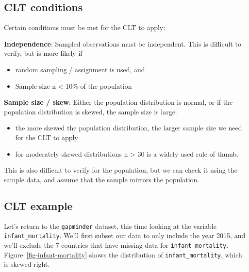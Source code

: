 \documentclass[
  letterpaper,
  DIV=11,
  numbers=noendperiod]{scrreprt}
\providecommand{\tightlist}{%
  \setlength{\itemsep}{0pt}\setlength{\parskip}{0pt}}\usepackage{longtable,booktabs,array}
\theoremstyle{definition}
\theoremstyle{remark}
\begin{document}
\hypertarget{clt-conditions}{%
\subsection{CLT conditions}\label{clt-conditions}}

Certain conditions must be met for the CLT to apply:

\textbf{Independence}: Sampled observations must be independent. This is
difficult to verify, but is more likely if

\begin{itemize}
\tightlist
\item
  random sampling / assignment is used, and
\item
  Sample size n \textless{} 10\% of the population
\end{itemize}

\textbf{Sample size / skew}: Either the population distribution is
normal, or if the population distribution is skewed, the sample size is
large.

\begin{itemize}
\tightlist
\item
  the more skewed the population distribution, the larger sample size we
  need for the CLT to apply
\item
  for moderately skewed distributions n \textgreater{} 30 is a widely
  used rule of thumb.
\end{itemize}

This is also difficult to verify for the population, but we can check it
using the sample data, and assume that the sample mirrors the
population.

\hypertarget{sec-clt-example}{%
\subsection{CLT example}\label{sec-clt-example}}

Let's return to the \texttt{gapminder} dataset, this time looking at the
variable \texttt{infant\_mortality}. We'll first subset our data to only
include the year 2015, and we'll exclude the 7 countries that have
missing data for \texttt{infant\_mortality}.
Figure~\ref{fig-infant-mortality} shows the distribution of
\texttt{infant\_mortality}, which is skewed right.
\end{document}
